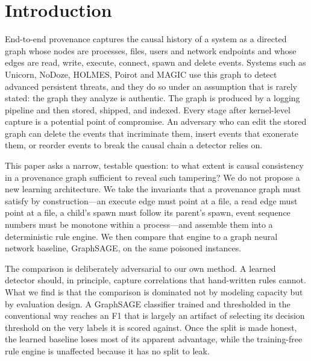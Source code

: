 \documentclass[conference]{IEEEtran}
\begin{document}
\section{Introduction}
End-to-end provenance captures the causal history of a system as a directed
graph whose nodes are processes, files, users and network endpoints and whose
edges are read, write, execute, connect, spawn and delete events. Systems such
as Unicorn, NoDoze, HOLMES, Poirot and MAGIC use this graph to detect advanced
persistent threats, and they do so under an assumption that is rarely stated:
the graph they analyze is authentic. The graph is produced by a logging pipeline
and then stored, shipped, and indexed. Every stage after kernel-level capture is
a potential point of compromise. An adversary who can edit the stored graph can
delete the events that incriminate them, insert events that exonerate them, or
reorder events to break the causal chain a detector relies on.

This paper asks a narrow, testable question: to what extent is causal
consistency in a provenance graph sufficient to reveal such tampering? We do not
propose a new learning architecture. We take the invariants that a provenance
graph must satisfy by construction---an execute edge must point at a file, a
read edge must point at a file, a child's spawn must follow its parent's spawn,
event sequence numbers must be monotone within a process---and assemble them
into a deterministic rule engine. We then compare that engine to a graph neural
network baseline, GraphSAGE, on the same poisoned instances.

The comparison is deliberately adversarial to our own method. A learned detector
should, in principle, capture correlations that hand-written rules cannot. What
we find is that the comparison is dominated not by modeling capacity but by
evaluation design. A GraphSAGE classifier trained and thresholded in the
conventional way reaches an F1 that is largely an artifact of selecting its
decision threshold on the very labels it is scored against. Once the split is
made honest, the learned baseline loses most of its apparent advantage, while
the training-free rule engine is unaffected because it has no split to leak.
\end{document}
